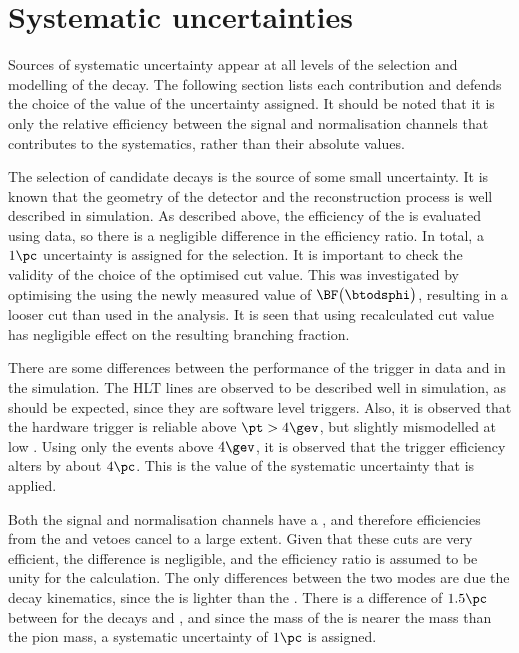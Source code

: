 \section{Systematic uncertainties}
\label{sec:dsphi:syst}

Sources of systematic uncertainty appear at all levels of the selection and modelling of the decay.
The following section lists each contribution and defends the choice of the value of the
uncertainty assigned.
It should be noted that it is only the relative efficiency between the signal and normalisation
channels that contributes to the systematics, rather than their absolute values.

The selection of candidate \btodsphi decays is the source of some small uncertainty.
It is known that the geometry of the detector and the reconstruction process is well described in
simulation.
As described above, the efficiency of the \bdt is evaluated using data, so there is a negligible
difference in the efficiency ratio.
In total, a $1\pc$ uncertainty is assigned for the selection.
It is important to check the validity of the choice of the optimised \bdt cut value.
This was investigated by optimising the \bdt using the newly measured value of
$\BF\big(\btodsphi\big)$, resulting in a looser cut than used in the analysis.
It is seen that using recalculated \bdt cut value has negligible effect on the resulting branching
fraction.

There are some differences between the performance of the trigger in data and in the simulation.
The HLT lines are observed to be described well in simulation, as should be expected, since they
are software level triggers.
Also, it is observed that the \lone hardware trigger is reliable above $\pt>4\gev$, but slightly
mismodelled at low \pt.
Using only the events above $4\gev$, it is observed that the trigger efficiency alters by about
$4\pc$.
This is the value of the systematic uncertainty that is applied.

Both the signal and normalisation channels have a \dstokkpi, and therefore efficiencies from the \Dp and
\Lc vetoes cancel to a large extent.
Given that these cuts are very efficient, the difference is negligible, and the efficiency ratio is
assumed to be unity for the calculation.
The only differences between the two modes are due the decay kinematics, since the \phii is lighter
than the \Dz.
There is a difference of $1.5\pc$ between  for the decays \decay{\Bsb}{\Dsp\pim} and
\btodsd, and
since the mass of the \phii is nearer the \Dz mass than the pion mass, a systematic uncertainty of
$1\pc$ is assigned.

